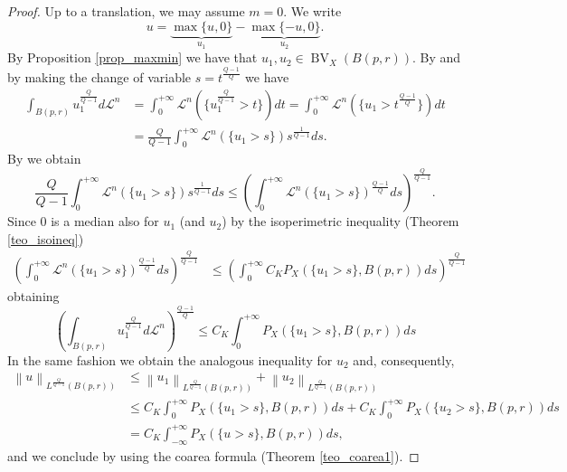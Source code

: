 \documentclass[12pt,a4paper]{amsart}
\theoremstyle{definition}
\theoremstyle{plain}
\newcommand{\leb}{\mathcal{L}}
\newcommand{\bv}{\operatorname{BV}}
\newcommand{\nl}{\left\|}
\newcommand{\nr}{\right\|}
\begin{document}
\begin{proof}
    Up to a translation, we may assume $m=0$. We write 
    \[
    u=\underbrace{\max\{u,0\}}_{u_1}-\underbrace{\max\{-u,0\}}_{u_2}.
    \]
    By Proposition  \ref{prop_maxmin} we  have that $u_1,u_2 \in \bv_X(B(p,r))$.  By \cite[Proposition 1.78]{afp} and by making the change of variable $s=t^\frac{Q-1}{Q}$ we have
    \begin{align*}
    \int_{B(p,r)} u_1^\frac{Q}{Q-1}d\leb^n&= \int_0^{+\infty} \leb^n (\{u_1^\frac{Q}{Q-1}>t\})dt=\int_0^{+\infty}  \leb^n (\{u_1>t^\frac{Q-1}{Q}\})dt\\&=\frac{Q}{Q-1}\int_0^{+\infty} \leb^n(\{u_1>s\})s^\frac{1}{Q-1}ds.
    \end{align*}
   By \cite[Lemma 3.48]{afp} we obtain
   \[
   \frac{Q}{Q-1}\int_0^{+\infty} \leb^n(\{u_1>s\})s^\frac{1}{Q-1}ds \leq \left(   \int_0^{+\infty} \leb^n(\{u_1>s\})^\frac{Q-1}{Q} ds\right)^\frac{Q}{Q-1}.
   \]
Since $0$ is a median also for $u_1$ (and $u_2$) by the isoperimetric inequality (Theorem \ref{teo_isoineq})
\begin{align*}
\left( \int_0^{+\infty} \leb^n(\{u_1>s\})^\frac{Q-1}{Q} ds\right)^\frac{Q}{Q-1} &\leq \left( \int_0^{+\infty} C_KP_X(\{u_1>s\},B(p,r)) ds      \right)^\frac{Q}{Q-1}
\end{align*}
obtaining 
\[
  \left(  \int_{B(p,r)} u_1^\frac{Q}{Q-1}d\leb^n \right)^\frac{Q-1}{Q}\leq  C_K\int_0^{+\infty}P_X(\{u_1>s\},B(p,r)) ds   
\]
In the same fashion we obtain the analogous inequality for $u_2$ and, consequently,
\begin{align*}
\nl u \nr_{L^\frac{Q}{Q-1}(B(p,r))} &\leq \nl u_1 \nr_{L^\frac{Q}{Q-1}(B(p,r))}+\nl u_2 \nr_{L^\frac{Q}{Q-1} (B(p,r))}\\& \leq C_K\int_0^{+\infty}P_X(\{u_1>s\},B(p,r)) ds   +C_K\int_0^{+\infty}P_X(\{u_2>s\},B(p,r)) ds   \\&=C_K \int_{-\infty}^{+\infty}P_X(\{u>s\},B(p,r)) ds, 
\end{align*}
and we conclude by using the coarea formula (Theorem \ref{teo_coarea1}).
\end{proof}
\end{document}
